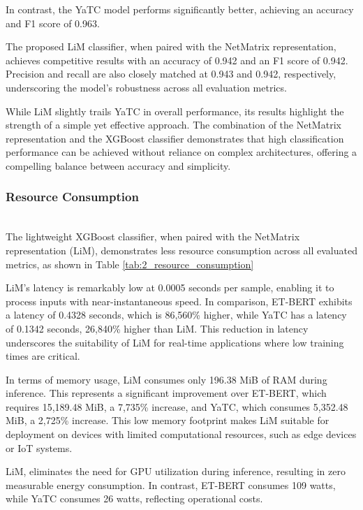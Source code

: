 In contrast, the YaTC model performs significantly better, achieving an accuracy and F1 score of 0.963.

The proposed LiM classifier, when paired with the NetMatrix representation, achieves competitive results with an accuracy of 0.942 and an F1 score of 0.942. Precision and recall are also closely matched at 0.943 and 0.942, respectively, underscoring the model's robustness across all evaluation metrics.

While LiM slightly trails YaTC in overall performance, its results highlight the strength of a simple yet effective approach. The combination of the NetMatrix representation and the XGBoost classifier demonstrates that high classification performance can be achieved without reliance on complex architectures, offering a compelling balance between accuracy and simplicity.

\subsubsection{Resource Consumption} \label{subsubsec:scalability} \hfill\\
The lightweight XGBoost classifier, when paired with the NetMatrix representation (LiM), demonstrates less resource consumption across all evaluated metrics, as shown in Table \ref{tab:2_resource_consumption}



LiM's latency is remarkably low at 0.0005 seconds per sample, enabling it to process inputs with near-instantaneous speed. In comparison, ET-BERT exhibits a latency of 0.4328 seconds, which is 86,560\% higher, while YaTC has a latency of 0.1342 seconds, 26,840\% higher than LiM. This reduction in latency underscores the suitability of LiM for real-time applications where low training times are critical.

In terms of memory usage, LiM consumes only 196.38 MiB of RAM during inference. This represents a significant improvement over ET-BERT, which requires 15,189.48 MiB, a 7,735\% increase, and YaTC, which consumes 5,352.48 MiB, a 2,725\% increase. This low memory footprint makes LiM suitable for deployment on devices with limited computational resources, such as edge devices or IoT systems.

LiM, eliminates the need for GPU utilization during inference, resulting in zero measurable energy consumption. In contrast, ET-BERT consumes 109 watts, while YaTC consumes 26 watts, reflecting operational costs. 

